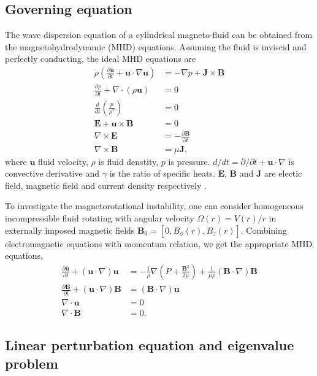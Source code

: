 \documentclass{jfm}
\newcommand{\del}{\nabla}
\begin{document}
%
%
\subsection{Governing equation}

The wave dispersion equation of a cylindrical magneto-fluid can be obtained 
from the magnetohydrodynamic (MHD) equations. Assuming the fluid is inviscid 
and perfectly conducting, the ideal MHD equations are 
\begin{align}
    \rho\left(\frac{\partial\mathbf{u}}{\partial t}+\mathbf{u}\cdot\del\mathbf{u}\right) &= -\del p +\mathbf{J}\times\mathbf{B} \\
    \frac{\partial \rho}{\partial t} + \del\cdot(\rho \mathbf{u})&=0 \\
    \frac{d}{dt}\left(\frac{p}{\rho^\gamma}\right)&=0\\
    \mathbf{E}+\mathbf{u}\times\mathbf{B}&=0 \\
    \del\times \mathbf{E} &= -\frac{\partial \mathbf{B}}{\partial t} \\
    \del \times \mathbf{B} &= \mu \mathbf{J},
\end{align}
where $\mathbf{u}$ fluid velocity, $\rho$ is fluid denstity, $p$ is pressure. 
$d/dt=\partial/\partial t +\mathbf{u}\cdot\del$ is convective derivative and 
$\gamma$ is the ratio of specific heats. $\mathbf{E}$, $\mathbf{B}$ and 
$\mathbf{J}$ are electic field, magnetic field and current density respectively
\cite[see][]{Freidberg1987}.

To investigate the magnetorotational instability, one can consider homogeneous
incompressible fluid rotating 
with angular velocity $\Omega(r)=V(r) / r$ in externally imposed magnetic 
fields $\mathbf{B}_0 = [0,B_\phi(r),B_z(r)]$. Combining electromagnetic 
equations with momentum relation, we get the appropriate MHD equations,
\begin{align}
    \frac{\partial \mathbf{u}}{\partial t}+(\mathbf{u}\cdot\del)\mathbf{u} &= -\frac{1}{\rho}\del\left(P+\frac{\mathbf{B}^2}{2\mu}\right)+\frac{1}{\mu\rho}(\mathbf{B}\cdot\del)\mathbf{B}\\
    \frac{\partial \mathbf{B}}{\partial t} +(\mathbf{u}\cdot\del)\mathbf{B} &=(\mathbf{B}\cdot\del)\mathbf{u} \\
    \del\cdot\mathbf{u}&=0\\
    \del \cdot \mathbf{B} &=0.
\end{align}


%
%
\subsection{Linear perturbation equation and eigenvalue problem}
\end{document}
